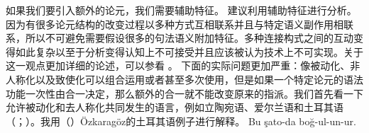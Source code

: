 \noindent
如果我们要引入额外的论元，我们需要辅助特征。 \citet{Koenig99a}建议利用辅助特征进行分析。因为有很多论元结构的改变过程以多种方式互相联系并且与特定语义副作用相联系，所以不可避免需要假设很多的句法语义附加特征。多种连接构式之间的互动变得如此复杂以至于分析变得认知上不可接受并且应该被认为技术上不可实现。关于这一观点更加详细的论述，可以参看 。
下面的实际问题更加严重：像被动化、非人称化以及致使化可以组合运用或者甚至多次使用，但是如果一个特定论元的语法功能一次性由合一决定，那么额外的合一就不能改变原来的指派。我们首先看一下允许被动化和去人称化共同发生的语言，例如立陶宛语\citep[\S~5]{Timberlake82a}、爱尔兰语\citep{Noonan94a}和土耳其语 （\citealp{Ozkaragoez86a}；\citealp[\S~2.3.3]{Knecht85a-u}）。我用（）Özkaragöz的土耳其语例子进行解释\citeyearpar[]{Ozkaragoez86a}。
\eal\label{ex-double-passivization}
\ex\label{ex-double-passivization-strangle}
\gll Bu şato-da boğ-ul-un-ur.\\
